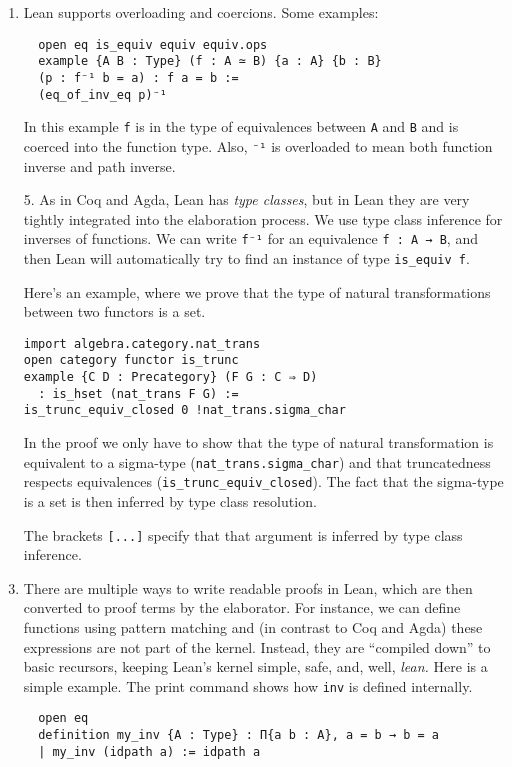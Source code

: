 \documentclass[12pt]{amsart}  %
\begin{document}
\begin{enumerate}
\item 
Lean supports overloading and coercions. Some examples:

\begin{lstlisting}
  open eq is_equiv equiv equiv.ops
  example {A B : Type} (f : A ≃ B) {a : A} {b : B}
  (p : f⁻¹ b = a) : f a = b :=
  (eq_of_inv_eq p)⁻¹
\end{lstlisting}

In this example \lstinline{f} is in the type of equivalences between \lstinline{A} and \lstinline{B} and is coerced into the function type.
Also, \lstinline{⁻¹} is overloaded to mean both function inverse and path inverse.

\item[5.] 
  As in Coq and Agda, Lean has \emph{type classes}, but in Lean they are very tightly integrated into the elaboration process.
  We use type class inference for inverses of functions. We can write \lstinline{f⁻¹} for an equivalence \lstinline{f : A → B},
  and then Lean will automatically try to find an instance of type \lstinline{is_equiv f}.

Here's an example, where we prove that the type of natural transformations between two functors is a set.
\begin{lstlisting}
import algebra.category.nat_trans
open category functor is_trunc
example {C D : Precategory} (F G : C ⇒ D)
  : is_hset (nat_trans F G) :=
is_trunc_equiv_closed 0 !nat_trans.sigma_char
\end{lstlisting}
In the proof we only have to show that the type of natural transformation is equivalent to a sigma-type (\lstinline{nat_trans.sigma_char})
and that truncatedness respects equivalences (\lstinline{is_trunc_equiv_closed}). The fact that the sigma-type is a set is
then inferred by type class resolution.

The brackets \lstinline{[...]} specify that that argument is inferred by type class inference.

\item[6.]
  There are multiple ways to write readable proofs in Lean, which are then converted to proof terms by the elaborator.
  For instance, we can define functions using pattern matching and (in contrast to Coq and Agda) these expressions
  are not part of the kernel. Instead, they are ``compiled down'' to basic recursors, keeping Lean's kernel simple,
  safe, and, well, \emph{lean.} Here is a simple example. The print command shows how \lstinline{inv} is defined internally.

\begin{lstlisting}
  open eq
  definition my_inv {A : Type} : Π{a b : A}, a = b → b = a
  | my_inv (idpath a) := idpath a
 

\end{lstlisting}
\end{enumerate}
\end{document}
